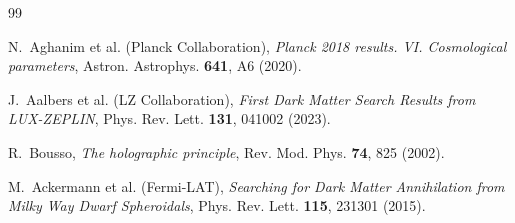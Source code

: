 \documentclass[11pt,a4paper]{article}
\begin{document}

\begin{thebibliography}{99}

N.~Aghanim et al. (Planck Collaboration),
\emph{Planck 2018 results. VI. Cosmological parameters},
Astron. Astrophys. \textbf{641}, A6 (2020).

J.~Aalbers et al. (LZ Collaboration),
\emph{First Dark Matter Search Results from LUX-ZEPLIN},
Phys. Rev. Lett. \textbf{131}, 041002 (2023).

R.~Bousso,
\emph{The holographic principle},
Rev. Mod. Phys. \textbf{74}, 825 (2002).

M.~Ackermann et al. (Fermi-LAT),
\emph{Searching for Dark Matter Annihilation from Milky Way Dwarf Spheroidals},
Phys. Rev. Lett. \textbf{115}, 231301 (2015).

\end{thebibliography}
\end{document}
